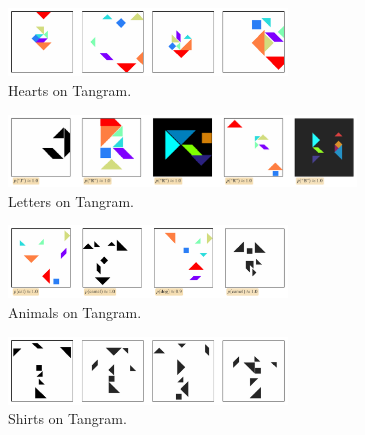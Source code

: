 \begin{figure}[H]
    \centering
    \includegraphics[width=0.66\textwidth]{images/curation_heart.pdf}
    \caption{Hearts on Tangram.}
    \label{fig:curation_heart}
\end{figure}

\begin{figure}[H]
    \centering
    \includegraphics[width=0.824\textwidth]{images/curation_letters.pdf}
    \caption{Letters on Tangram.}
    \label{fig:curation_letters}
\end{figure}


\begin{figure}[H]
    \centering
    \includegraphics[width=0.66\textwidth]{images/curation_faces_all.pdf}
    \caption{Animals on Tangram.}
    \label{fig:curation_animals}
\end{figure}

\begin{figure}[H]
    \centering
    \includegraphics[width=0.66\textwidth]{images/curation_shirt_all.pdf}
    \caption{Shirts on Tangram.}
    \label{fig:curation_shirt_all}
\end{figure}

